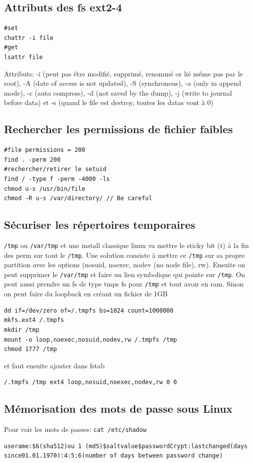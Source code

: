 \subsection{Attributs des fs ext2-4}
\begin{Verbatim}[breaklines=true, breakanywhere=true]
#set
chattr -i file
#get
lsattr file
\end{Verbatim}
Attributs: -i (peut pas être modifié, supprimé, renommé or lié même pas par le root), -A (date of access is not updated), -S (synchronous), -a (only in append mode), -c (auto compress), -d (not saved by the dump), -j (write to journal before data) et -s (quand le file est destroy, toutes les datas vont à 0)
\subsection{Rechercher les permissions de fichier faibles}
\begin{Verbatim}[breaklines=true, breakanywhere=true]
#file permissions = 200
find . -perm 200
#rechercher/retirer le setuid 
find / -type f -perm -4000 -ls 
chmod u-s /usr/bin/file 
chmod -R u-s /var/directory/ // Be careful
\end{Verbatim}

\subsection{Sécuriser les répertoires temporaires}
\verb!/tmp! ou \verb!/var/tmp! et une install classique linux va mettre le sticky bit (t) à la fin des perm sur tout le \verb!/tmp!. Une solution consiste à mettre ce \verb!/tmp! sur sa propre partition avec les options (nosuid, noexec, nodev (no node file), rw). Ensuite on peut supprimer le \verb!/var/tmp! et faire un lien symbolique qui pointe sur \verb!/tmp!. On peut aussi prendre un fs de type tmps fs pour \verb!/tmp! et tout avoir en ram.
Sinon on peut faire du loopback en créant un fichier de 1GB
\begin{Verbatim}[breaklines=true, breakanywhere=true]
dd if=/dev/zero of=/.tmpfs bs=1024 count=1000000
mkfs.ext4 /.tmpfs
mkdir /tmp
mount -o loop,noexec,nosuid,nodev,rw /.tmpfs /tmp
chmod 1777 /tmp
\end{Verbatim}
et faut ensuite ajouter dans fstab
\begin{Verbatim}[breaklines=true, breakanywhere=true]
/.tmpfs /tmp ext4 loop,nosuid,noexec,nodev,rw 0 0
\end{Verbatim}

\subsection{Mémorisation des mots de passe sous Linux}
Pour voir les mots de passes: \verb!cat /etc/shadow!
\begin{Verbatim}[breaklines=true, breakanywhere=true]
userame:$6(sha512)ou 1 (md5)$saltvalue$passwordCrypt:lastchanged(days since01.01.1970):4:5:6(number of days between password change)
\end{Verbatim}

